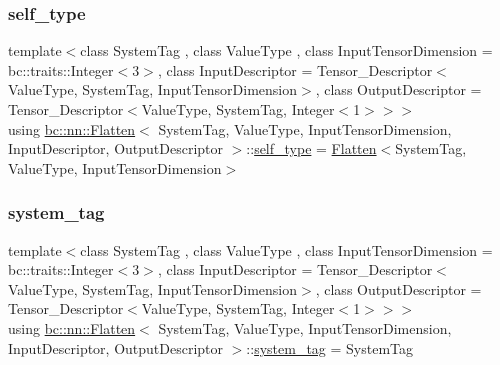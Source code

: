 \subsubsection{\texorpdfstring{self\+\_\+type}{self\_type}}
{\footnotesize\ttfamily template$<$class System\+Tag , class Value\+Type , class Input\+Tensor\+Dimension  = bc\+::traits\+::\+Integer$<$3$>$, class Input\+Descriptor  = Tensor\+\_\+\+Descriptor$<$\+Value\+Type, System\+Tag, Input\+Tensor\+Dimension$>$, class Output\+Descriptor  = Tensor\+\_\+\+Descriptor$<$\+Value\+Type, System\+Tag, Integer$<$1$>$$>$$>$ \\
using \hyperlink{structbc_1_1nn_1_1Flatten}{bc\+::nn\+::\+Flatten}$<$ System\+Tag, Value\+Type, Input\+Tensor\+Dimension, Input\+Descriptor, Output\+Descriptor $>$\+::\hyperlink{structbc_1_1nn_1_1Flatten_a8bf8c3ab507fae549695110b4c1d4762}{self\+\_\+type} =  \hyperlink{structbc_1_1nn_1_1Flatten}{Flatten}$<$System\+Tag, Value\+Type, Input\+Tensor\+Dimension$>$}

\mbox{\label{structbc_1_1nn_1_1Flatten_a3691e26f7d05a76e7c84f86930e4a5ed}} 
\subsubsection{\texorpdfstring{system\+\_\+tag}{system\_tag}}
{\footnotesize\ttfamily template$<$class System\+Tag , class Value\+Type , class Input\+Tensor\+Dimension  = bc\+::traits\+::\+Integer$<$3$>$, class Input\+Descriptor  = Tensor\+\_\+\+Descriptor$<$\+Value\+Type, System\+Tag, Input\+Tensor\+Dimension$>$, class Output\+Descriptor  = Tensor\+\_\+\+Descriptor$<$\+Value\+Type, System\+Tag, Integer$<$1$>$$>$$>$ \\
using \hyperlink{structbc_1_1nn_1_1Flatten}{bc\+::nn\+::\+Flatten}$<$ System\+Tag, Value\+Type, Input\+Tensor\+Dimension, Input\+Descriptor, Output\+Descriptor $>$\+::\hyperlink{structbc_1_1nn_1_1Flatten_a3691e26f7d05a76e7c84f86930e4a5ed}{system\+\_\+tag} =  System\+Tag}

\mbox{\label{structbc_1_1nn_1_1Flatten_af6a4f22abc0a8e8f8bb1624abd97b500}} 
